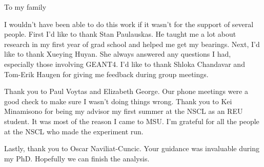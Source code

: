\documentclass{msuphddissertation}
\begin{document}

\begin{dedication} 
To my family


\end{dedication}

\begin{acknowledgment}
I wouldn't have been able to do this work if it wasn't for the support of several people.
First I'd like to thank Stan Paulauskas.
He taught me a lot about research in my first year of grad school and helped me get my bearings.
Next, I'd like to thank Xueying Huyan.
She always answered any questions I had, especially those involving GEANT4.
I'd like to thank Shloka Chandavar and Tom-Erik Haugen for giving me feedback during group meetings. 

Thank you to Paul Voytas and Elizabeth George.
Our phone meetings were a good check to make sure I wasn't doing things wrong.
Thank you to Kei Minamisono for being my advisor my first summer at the NSCL as an REU student.
It was most of the reason I came to MSU.
I'm grateful for all the people at the NSCL who made the experiment run.

Lastly, thank you to Oscar Naviliat-Cuncic. 
Your guidance was invaluable during my PhD.
Hopefully we can finish the analysis. 


\end{acknowledgment}

\end{document}
